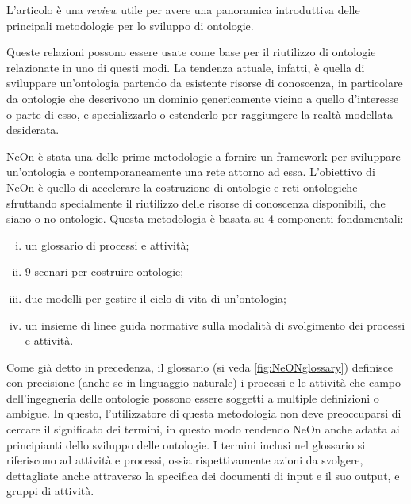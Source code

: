 L'articolo \cite{iqbal2013analysis} è una \textit{review} utile per avere una panoramica introduttiva delle principali metodologie per lo sviluppo di ontologie.

Queste relazioni possono essere usate come base per il riutilizzo di ontologie relazionate in uno di questi modi. La tendenza attuale, infatti, è quella di sviluppare un'ontologia partendo da esistente risorse di conoscenza, in particolare da ontologie che descrivono un dominio genericamente vicino a quello d'interesse o parte di esso, e specializzarlo o estenderlo per raggiungere la realtà modellata desiderata.

NeOn \cite{NeOn} è stata una delle prime metodologie a fornire un framework per sviluppare un'ontologia e contemporaneamente una rete attorno ad essa. L'obiettivo di NeOn è quello di accelerare la costruzione di ontologie e reti ontologiche sfruttando specialmente il riutilizzo delle risorse di conoscenza disponibili, che siano o no ontologie. Questa metodologia è basata su 4 componenti fondamentali:
\begin{enumerate}[i.]
	\item un glossario di processi e attività;
	\label{itm:glossario}
	\item 9 scenari per costruire ontologie;
	\label{itm:scenari}
	\item due modelli per gestire il ciclo di vita di un'ontologia;
	\item un insieme di linee guida normative sulla modalità di svolgimento dei processi e attività.
\end{enumerate}
Come già detto in precedenza, il glossario (si veda \autoref{fig:NeONglossary}) definisce con precisione (anche se in linguaggio naturale) i processi e le attività che campo dell'ingegneria delle ontologie possono essere soggetti a multiple definizioni o ambigue. In questo, l'utilizzatore di questa metodologia non deve preoccuparsi di cercare il significato dei termini, in questo modo rendendo NeOn anche adatta ai principianti dello sviluppo delle ontologie. I termini inclusi nel glossario si riferiscono ad attività e processi, ossia rispettivamente azioni da svolgere, dettagliate anche attraverso la specifica dei documenti di input e il suo output, e gruppi di attività. 

